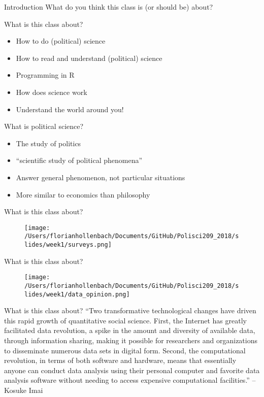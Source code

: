 \documentclass[presentation]{beamer}
\begin{document}
\begin{frame}[label={sec:org17b2169}]{Introduction}
What do you think this class is (or should be) about?
\end{frame}


\begin{frame}[label={sec:orge0802cb}]{What is this class about?}
\begin{itemize}
\item How to do (political) science
\item How to read and understand (political) science
\item Programming in R
\item How does science work
\item Understand the world around you!
\end{itemize}
\end{frame}

\begin{frame}[label={sec:orgf903823}]{What is political science?}
\begin{itemize}
\item The study of politics
\item “scientific study of political phenomena”
\item Answer general phenomenon, not particular situations
\item More similar to economics than philosophy
\end{itemize}
\end{frame}

\begin{frame}[label={sec:orgcbbbec0}]{What is this class about?}
\begin{figure}[htbp]
\centering
\texttt{[image: /Users/florianhollenbach/Documents/GitHub/Polisci209\_2018/slides/week1/surveys.png]}
\label{fig:org4e68d9c}
\end{figure}
\end{frame}

\begin{frame}[label={sec:org486fde4}]{What is this class about?}
\begin{figure}[htbp]
\centering
\texttt{[image: /Users/florianhollenbach/Documents/GitHub/Polisci209\_2018/slides/week1/data\_opinion.png]}
\label{fig:org2d3e519}
\end{figure}
\end{frame}


\begin{frame}[label={sec:orgefef936}]{What is this class about?}
``Two transformative technological changes have driven this rapid growth of quantitative social science. First, the Internet has greatly facilitated data revolution, a spike in the amount and diversity of available data, through information sharing, making it possible for researchers and organizations to disseminate numerous data sets in digital form. Second, the computational revolution, in terms of both software and hardware, means that essentially anyone can conduct data analysis using their personal computer and favorite data analysis software without needing to access expensive computational facilities.'' -- Kosuke Imai
\end{frame}
\end{document}
